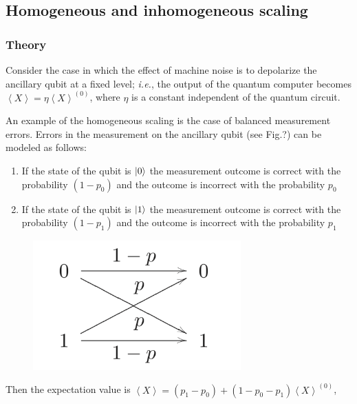 \documentclass[11pt, oneside]{article}   	%
\begin{document}
\subsection{Homogeneous and inhomogeneous scaling}
\subsubsection{Theory}
Consider the case in which the effect of machine noise is to depolarize the ancillary qubit at a fixed level; \textit{i.e.}, the output of the quantum computer becomes 
$\left< X \right> = \eta \left< X \right>^{(0)}$, 
where $\eta$ is a constant independent of the quantum circuit. 

An example of the homogeneous scaling is the case of balanced measurement errors. 
Errors in the measurement on the ancillary qubit (see Fig.?) can be modeled as follows: 
\begin{enumerate}
\item
If the state of the qubit is $\ket{0}$ the measurement outcome is correct with the probability $(1-p_0)$ and the outcome is incorrect with the probability $p_0$
\item
If the state of the qubit is $\ket{1}$ the measurement outcome is correct with the probability $(1-p_1)$ and the outcome is incorrect with the probability $p_1$
\end{enumerate}

\begin{figure}[t]
\includegraphics[width=8cm]{./img/bitflip}
\centering
\end{figure}

Then the expectation value is 
$\left< X \right> = (p_1 - p_0) + (1 - p_0 - p_1) \left< X \right>^{(0)}$, 
\end{document}
